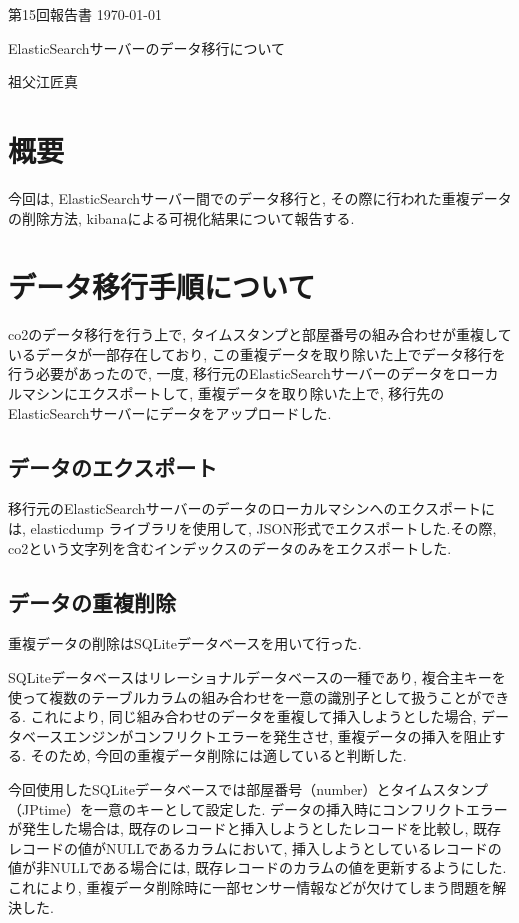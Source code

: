 \documentclass[a4j,12pt,]{jarticle}
\begin{document}
{\noindent\small 第15回報告書 \hfill\today}
\begin{center}
  {\Large ElasticSearchサーバーのデータ移行について}
\end{center}
\begin{flushright}
  祖父江匠真 \\
\end{flushright}

\section{概要}
今回は, ElasticSearchサーバー間でのデータ移行と, その際に行われた重複データの削除方法, kibanaによる可視化結果について報告する.

\section{データ移行手順について}

co2のデータ移行を行う上で, タイムスタンプと部屋番号の組み合わせが重複しているデータが一部存在しており, この重複データを取り除いた上でデータ移行を行う必要があったので, 一度, 移行元のElasticSearchサーバーのデータをローカルマシンにエクスポートして, 重複データを取り除いた上で, 移行先のElasticSearchサーバーにデータをアップロードした.

\subsection{データのエクスポート}
移行元のElasticSearchサーバーのデータのローカルマシンへのエクスポートには, elasticdump \cite{1}ライブラリを使用して, JSON形式でエクスポートした.その際, co2という文字列を含むインデックスのデータのみをエクスポートした.

\subsection{データの重複削除}
重複データの削除はSQLiteデータベースを用いて行った.

SQLiteデータベースはリレーショナルデータベースの一種であり, 複合主キーを使って複数のテーブルカラムの組み合わせを一意の識別子として扱うことができる. これにより, 同じ組み合わせのデータを重複して挿入しようとした場合, データベースエンジンがコンフリクトエラーを発生させ, 重複データの挿入を阻止する. そのため, 今回の重複データ削除には適していると判断した.

今回使用したSQLiteデータベースでは部屋番号（number）とタイムスタンプ（JPtime）を一意のキーとして設定した. データの挿入時にコンフリクトエラーが発生した場合は, 既存のレコードと挿入しようとしたレコードを比較し, 既存レコードの値がNULLであるカラムにおいて, 挿入しようとしているレコードの値が非NULLである場合には, 既存レコードのカラムの値を更新するようにした. これにより, 重複データ削除時に一部センサー情報などが欠けてしまう問題を解決した. 
\end{document}
